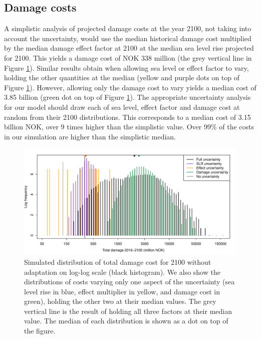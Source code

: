 \documentclass[draft,linenumbers]{agujournal}
\providecommand{\DIFaddbegin}{} %
\begin{document}
\subsection{Damage costs}
A simplistic analysis of projected damage costs at the year 2100, not taking into account the uncertainty, would use  the median  historical damage cost multiplied by  the median damage effect factor at 2100 at the median sea level rise projected for 2100. This yields a damage cost of NOK 338 million (the grey vertical line in Figure \ref{fig:costunc}). Similar results obtain when allowing sea level or effect factor to vary, holding the other quantities at the median (yellow and purple dots on top of Figure \ref{fig:costunc}). However, allowing only the damage cost to vary yields a median cost of 3.85 billion (green dot on top of Figure \ref{fig:costunc}). The appropriate uncertainty analysis for our model should draw each of sea level, effect factor and damage cost at random from their 2100 distributions. This corresponds to a median cost of 3.15 billion NOK, over 9 times higher than the simplistic value. Over 99\% of the costs in our simulation are higher than the simplistic median.

\begin{figure}[!hbpt]
\begin{center}
\includegraphics[width=0.8\linewidth]{UncertaintyLog.pdf}
\caption{Simulated distribution of total damage cost for 2100 without adaptation on log-log scale (black histogram). We also show the distributions of costs varying only one aspect of the uncertainty (sea level rise in blue, effect multiplier in yellow, and damage cost in green), holding the other two at their median values. The grey vertical line is the result of holding all three factors at their median value. The median of each distribution is shown as a dot on top of the figure.} 
\label{fig:costunc}
\end{center}
\end{figure}
\DIFaddbegin 
\end{document}

